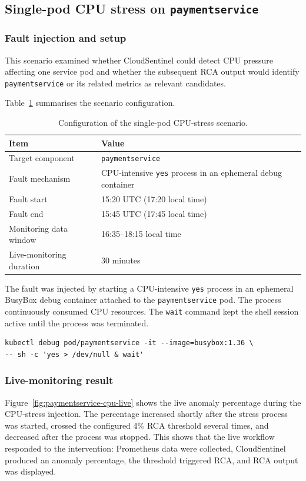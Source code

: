 \subsection{Single-pod CPU stress on \texttt{paymentservice}}
\subsubsection{Fault injection and setup}
This scenario examined whether CloudSentinel could detect CPU pressure affecting one service pod and whether the subsequent RCA output would identify \texttt{paymentservice} or its related metrics as relevant candidates.

Table~\ref{tab:paymentservice-cpu-setup} summarises the scenario configuration.

\begin{table}[htbp]
    \centering
    \small
    \caption{Configuration of the single-pod CPU-stress scenario.}
    \label{tab:paymentservice-cpu-setup}
    \begin{tabular}{l l}
        \toprule
        \textbf{Item} & \textbf{Value} \\
        \midrule
        Target component & \texttt{paymentservice} \\
        Fault mechanism & CPU-intensive \texttt{yes} process in an ephemeral debug container \\
        Fault start & 15:20 UTC (17:20 local time) \\
        Fault end & 15:45 UTC (17:45 local time) \\
        Monitoring data window & 16:35--18:15 local time \\
        Live-monitoring duration & 30 minutes \\
        \bottomrule
    \end{tabular}
\end{table}

The fault was injected by starting a CPU-intensive \texttt{yes} process in an ephemeral BusyBox debug container attached to the \texttt{paymentservice} pod. The process continuously consumed CPU resources. The \texttt{wait} command kept the shell session active until the process was terminated.

\begin{verbatim}
kubectl debug pod/paymentservice -it --image=busybox:1.36 \
-- sh -c 'yes > /dev/null & wait'
\end{verbatim}

\subsubsection{Live-monitoring result}
Figure~\ref{fig:paymentservice-cpu-live} shows the live anomaly percentage during the CPU-stress injection. The percentage increased shortly after the stress process was started, crossed the configured 4\% RCA threshold several times, and decreased after the process was stopped. This shows that the live workflow responded to the intervention: Prometheus data were collected, CloudSentinel produced an anomaly percentage, the threshold triggered RCA, and RCA output was displayed.

